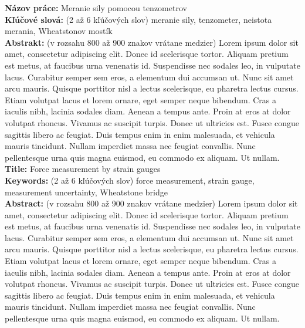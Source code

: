 \noindent
\textbf{Názov práce:} Meranie sily pomocou tenzometrov\\
\textbf{Kľúčové slová: } (2 až 6 kľúčových slov) meranie sily, tenzometer, neistota merania, Wheatstonov mostík\\
\textbf{Abstrakt: } (v rozsahu 800 až 900 znakov vrátane medzier) Lorem ipsum dolor sit amet, consectetur adipiscing elit. Donec id scelerisque tortor. Aliquam pretium est metus, at faucibus urna venenatis id. Suspendisse nec sodales leo, in vulputate lacus. Curabitur semper sem eros, a elementum dui accumsan ut. Nunc sit amet arcu mauris. Quisque porttitor nisl a lectus scelerisque, eu pharetra lectus cursus. Etiam volutpat lacus et lorem ornare, eget semper neque bibendum. Cras a iaculis nibh, lacinia sodales diam. Aenean a tempus ante. Proin at eros at dolor volutpat rhoncus. Vivamus ac suscipit turpis. Donec ut ultricies est. Fusce congue sagittis libero ac feugiat. Duis tempus enim in enim malesuada, et vehicula mauris tincidunt. Nullam imperdiet massa nec feugiat convallis. Nunc pellentesque urna quis magna euismod, eu commodo ex aliquam. Ut nullam.\\

\noindent
\textbf{Title:} Force measurement by strain gauges\\
\textbf{Keywords: } (2 až 6 kľúčových slov) force measurement, strain gauge, measurement uncertainty, Wheatstone bridge\\
\textbf{Abstract: } (v rozsahu 800 až 900 znakov vrátane medzier) Lorem ipsum dolor sit amet, consectetur adipiscing elit. Donec id scelerisque tortor. Aliquam pretium est metus, at faucibus urna venenatis id. Suspendisse nec sodales leo, in vulputate lacus. Curabitur semper sem eros, a elementum dui accumsan ut. Nunc sit amet arcu mauris. Quisque porttitor nisl a lectus scelerisque, eu pharetra lectus cursus. Etiam volutpat lacus et lorem ornare, eget semper neque bibendum. Cras a iaculis nibh, lacinia sodales diam. Aenean a tempus ante. Proin at eros at dolor volutpat rhoncus. Vivamus ac suscipit turpis. Donec ut ultricies est. Fusce congue sagittis libero ac feugiat. Duis tempus enim in enim malesuada, et vehicula mauris tincidunt. Nullam imperdiet massa nec feugiat convallis. Nunc pellentesque urna quis magna euismod, eu commodo ex aliquam. Ut  nullam.
\cleardoublepage
